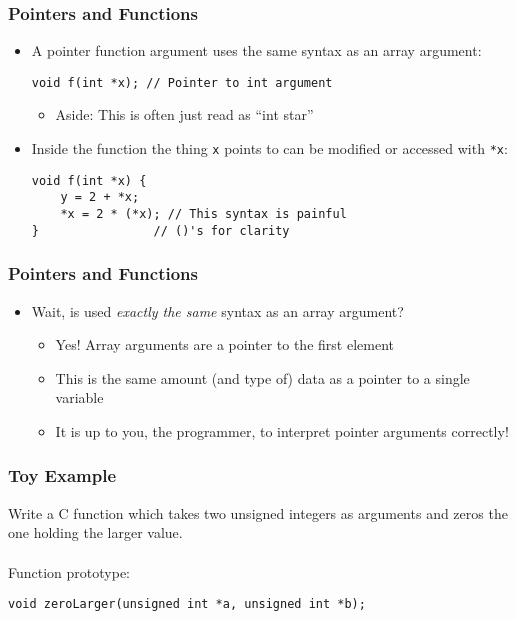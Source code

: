 \documentclass[14pt]{beamer}
\begin{document}
\begin{frame}[fragile]
\frametitle{Pointers and Functions}
\begin{itemize}
\item A pointer function argument uses the same syntax as an array argument:
\begin{lstlisting}[style=CStyle]
void f(int *x); // Pointer to int argument
\end{lstlisting}
	\begin{itemize}
		\item Aside: This is often just read as ``int star''	
	\end{itemize}
\item Inside the function the thing \texttt{x} points to can be modified or accessed with \texttt{*x}:
\begin{lstlisting}[style=CStyle]
void f(int *x) {
	y =	2 + *x;
	*x = 2 * (*x); // This syntax is painful
}                // ()'s for clarity

\end{lstlisting}
\end{itemize}
\end{frame}

\begin{frame}
\frametitle{Pointers and Functions}
\begin{itemize}
\item Wait, is used \textit{exactly the same} syntax as an array argument?
\pause
	\begin{itemize}
		\item Yes! Array arguments are a pointer to the first element
		\item This is the same amount (and type of) data as a pointer to a single variable
		\item It is up to you, the programmer, to interpret pointer arguments correctly!
	\end{itemize}
\end{itemize}
\end{frame}

\begin{frame}[fragile]
\frametitle{Toy Example}
Write a C function which takes two unsigned integers as arguments and zeros the one holding the larger value.
\\~\\
Function prototype:
\begin{lstlisting}[style=CStyle]
void zeroLarger(unsigned int *a, unsigned int *b);
\end{lstlisting}
\end{frame}
\end{document}

